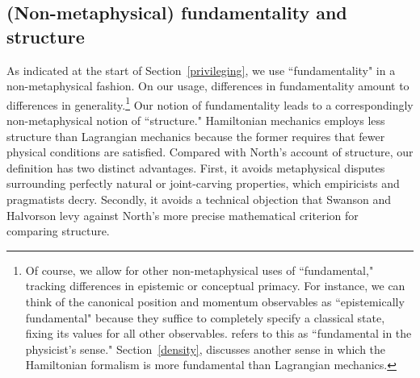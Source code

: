 \documentclass[letterpaper]{article}
\begin{document}



\subsection{(Non-metaphysical) fundamentality and structure}
\label{fundamentality}



As indicated at the start of Section~\ref{privileging}, we use ``fundamentality" in a non-metaphysical fashion. On our usage, differences in fundamentality amount to differences in generality.\footnote{Of course, we allow for other non-metaphysical uses of ``fundamental," tracking differences in epistemic or conceptual primacy. For instance, we can think of the canonical position and momentum observables as ``epistemically fundamental" because they suffice to completely specify a classical state, fixing its values for all other observables. \textcites[31, 200]{Ruetsche} refers to this as ``fundamental in the physicist's sense." Section~\ref{density}, discusses another sense in which the Hamiltonian formalism is more fundamental than Lagrangian mechanics.} Our notion of fundamentality leads to a correspondingly non-metaphysical notion of ``structure." Hamiltonian mechanics employs less structure than Lagrangian mechanics because the former requires that fewer physical conditions are satisfied. Compared with North's \parencites*[]{North} account of structure, our definition has two distinct advantages. First, it avoids metaphysical disputes surrounding perfectly natural or joint-carving properties, which empiricists and pragmatists decry. Secondly, it avoids a technical objection that Swanson and Halvorson \parencites*[]{Swanson} levy against North's more precise mathematical criterion for comparing structure. 
\end{document}
